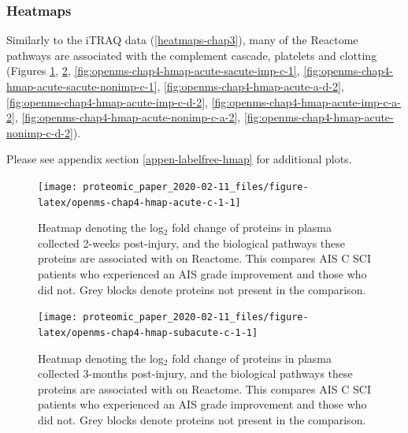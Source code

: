 \documentclass[
]{article}
\begin{document}
\hypertarget{heatmaps}{%
\subsubsection{Heatmaps}\label{heatmaps}}

Similarly to the iTRAQ data (\ref{heatmaps-chap3}), many of the Reactome pathways are associated with the complement cascade, platelets and clotting (Figures \ref{fig:openms-chap4-hmap-acute-c-1}, \ref{fig:openms-chap4-hmap-subacute-c-1}, \ref{fig:openms-chap4-hmap-acute-sacute-imp-c-1}, \ref{fig:openms-chap4-hmap-acute-sacute-nonimp-c-1}, \ref{fig:openms-chap4-hmap-acute-a-d-2}, \ref{fig:openms-chap4-hmap-acute-imp-c-d-2}, \ref{fig:openms-chap4-hmap-acute-imp-c-a-2}, \ref{fig:openms-chap4-hmap-acute-nonimp-c-a-2}, \ref{fig:openms-chap4-hmap-acute-nonimp-c-d-2}).

Please see appendix section \ref{appen-labelfree-hmap} for additional plots.

\begin{SidewaysFigure}



\begin{figure}

{\centering \texttt{[image: proteomic\_paper\_2020-02-11\_files/figure-latex/openms-chap4-hmap-acute-c-1-1]} 

}

\caption{Heatmap denoting the log$_2$ fold change of proteins in plasma collected 2-weeks post-injury, and the biological pathways these proteins are associated with on Reactome. This compares AIS C SCI patients who experienced an AIS grade improvement and those who did not. Grey blocks denote proteins not present in the comparison.}\label{fig:openms-chap4-hmap-acute-c-1}
\end{figure}

\end{SidewaysFigure}
\begin{SidewaysFigure}



\begin{figure}

{\centering \texttt{[image: proteomic\_paper\_2020-02-11\_files/figure-latex/openms-chap4-hmap-subacute-c-1-1]} 

}

\caption{Heatmap denoting the log$_2$ fold change of proteins in plasma collected 3-months post-injury, and the biological pathways these proteins are associated with on Reactome. This compares AIS C SCI patients who experienced an AIS grade improvement and those who did not. Grey blocks denote proteins not present in the comparison.}\label{fig:openms-chap4-hmap-subacute-c-1}
\end{figure}

\end{SidewaysFigure}
\clearpage
\end{document}
